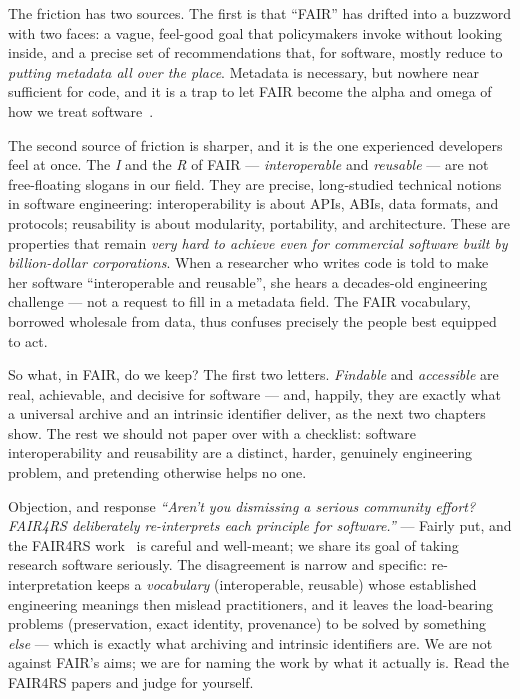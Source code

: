 The friction has two sources. The first is that \enquote{FAIR} has drifted into a buzzword with
two faces: a vague, feel-good goal that policymakers invoke without looking inside, and a precise
set of recommendations that, for software, mostly reduce to \emph{putting metadata all over the
place}. Metadata is necessary, but nowhere near sufficient for code, and it is a trap to let FAIR
become the alpha and omega of how we treat software~\autocite{NatureSD2026}.

The second source of friction is sharper, and it is the one experienced developers feel at once.
The \emph{I} and the \emph{R} of FAIR --- \emph{interoperable} and \emph{reusable} --- are not
free-floating slogans in our field. They are precise, long-studied technical notions in software
engineering: interoperability is about APIs, ABIs, data formats, and protocols; reusability is
about modularity, portability, and architecture. These are properties that remain \emph{very hard
to achieve even for commercial software built by billion-dollar corporations}. When a researcher
who writes code is told to make her software \enquote{interoperable and reusable}, she hears a
decades-old engineering challenge --- not a request to fill in a metadata field. The FAIR
vocabulary, borrowed wholesale from data, thus confuses precisely the people best equipped to act.


So what, in FAIR, do we keep? The first two letters. \emph{Findable} and \emph{accessible} are
real, achievable, and decisive for software --- and, happily, they are exactly what a universal
archive and an intrinsic identifier deliver, as the next two chapters show. The rest we should
not paper over with a checklist: software interoperability and reusability are a distinct, harder,
genuinely engineering problem, and pretending otherwise helps no one.

\begin{callout}{Objection, and response}
\small \emph{``Aren't you dismissing a serious community effort? FAIR4RS deliberately re-interprets
each principle \emph{for} software.''} --- Fairly put, and the FAIR4RS work~\autocite{barker2022fair4rs,Lamprecht2020}
is careful and well-meant; we share its goal of taking research software seriously. The disagreement
is narrow and specific: re-interpretation keeps a \emph{vocabulary} (interoperable, reusable) whose
established engineering meanings then mislead practitioners, and it leaves the load-bearing problems
(preservation, exact identity, provenance) to be solved by something \emph{else} --- which is exactly
what archiving and intrinsic identifiers are. We are not against FAIR's aims; we are for naming the
work by what it actually is. Read the FAIR4RS papers and judge for yourself.
\end{callout}

